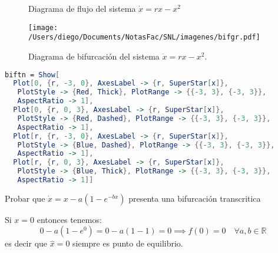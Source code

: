 \begin{figure}[H]
 \centering
  \subfloat[$r=0$]{
    \texttt{[image: /Users/diego/Documents/NotasFac/SNL/imagenes/bf=0.pdf]}}
    \caption{Diagrama de flujo del sistema $\dot{x}=rx-x^2$}
\end{figure}

\begin{figure}[!tbp]
  \centering
  \texttt{[image: /Users/diego/Documents/NotasFac/SNL/imagenes/bifgr.pdf]}
  \caption{Diagrama de bifurcación del sistema $\dot{x}=rx-x^2$.}
\end{figure}   

\begin{lstlisting}[language=Mathematica]
biftn = Show[
  Plot[0, {r, -3, 0}, AxesLabel -> {r, SuperStar[x]}, 
   PlotStyle -> {Red, Thick}, PlotRange -> {{-3, 3}, {-3, 3}}, 
   AspectRatio -> 1], 
  Plot[0, {r, 0, 3}, AxesLabel -> {r, SuperStar[x]}, 
   PlotStyle -> {Red, Dashed}, PlotRange -> {{-3, 3}, {-3, 3}}, 
   AspectRatio -> 1], 
  Plot[r, {r, -3, 0}, AxesLabel -> {r, SuperStar[x]}, 
   PlotStyle -> {Blue, Dashed}, PlotRange -> {{-3, 3}, {-3, 3}}, 
   AspectRatio -> 1], 
  Plot[r, {r, 0, 3}, AxesLabel -> {r, SuperStar[x]}, 
   PlotStyle -> {Blue, Thick}, PlotRange -> {{-3, 3}, {-3, 3}}, 
   AspectRatio -> 1]]
\end{lstlisting}  

\begin{ejemplo}
  Probar que $ \dot{x}=x-a(1-e^{-bx}) $ presenta una bifurcación transcritica
\end{ejemplo}

Si $x=0$ entonces tenemos:  $$
0-a(1-e^{0})=0-a(1-1)=0 \implies f(0)=0 \quad \forall a,b \in \mathbb{R}
$$
es decir que $\hat{x}=0$ siempre es punto de equilibrio. \\


